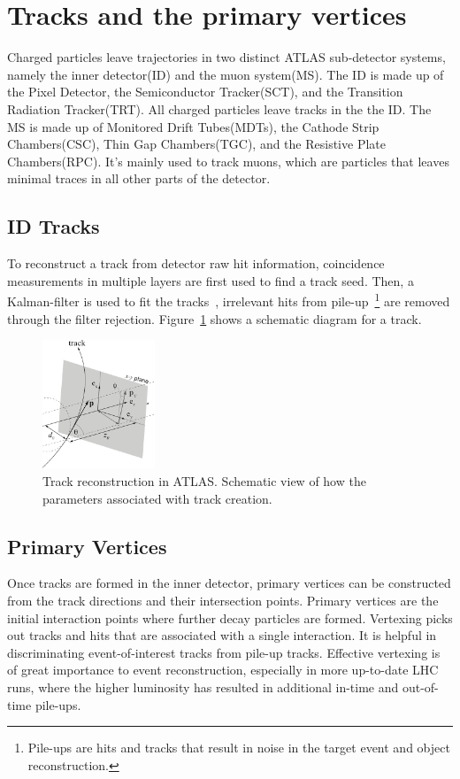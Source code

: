 \section{Tracks and the primary vertices}
\label{sec:Tracks}
Charged particles leave trajectories in two distinct ATLAS sub-detector systems, namely the inner detector(ID) and the muon system(MS). The ID is made up of the Pixel Detector, the Semiconductor Tracker(SCT), and the Transition Radiation Tracker(TRT). All charged particles leave tracks in the the ID. The MS is made up of Monitored Drift Tubes(MDTs), the Cathode Strip Chambers(CSC), Thin Gap Chambers(TGC), and the Resistive Plate Chambers(RPC). It's mainly used to track muons,
which are particles that leaves minimal traces in all other parts of the detector. 

\subsection{ID Tracks}
To reconstruct a track from detector raw hit information, coincidence measurements in multiple layers are first used to find a track seed. Then, a Kalman-filter is used to fit the tracks~\cite{track}, irrelevant hits from pile-up~\footnote{Pile-ups are hits and tracks that result in noise in the target event and object reconstruction.} are removed through the filter rejection. Figure~\ref{fig:track} shows a schematic diagram for a track.

\begin{figure}[!htb]
    \begin{center}
        \includegraphics[width=0.3\textwidth]{figures/common_ana/Track}
        \caption{ 
            Track reconstruction in ATLAS. Schematic view of how the parameters associated with track creation.
        }
        \label{fig:track}
    \end{center}
\end{figure}

\subsection{Primary Vertices}
Once tracks are formed in the inner detector, primary vertices can be constructed from the track directions and their intersection points. Primary vertices are the initial interaction points where further decay particles are formed. Vertexing picks out tracks and hits that are associated with a single interaction. It is helpful in discriminating event-of-interest tracks from pile-up tracks. Effective vertexing is of great importance to event reconstruction, especially in more up-to-date
LHC runs, where the higher luminosity has resulted in additional in-time and out-of-time pile-ups.

